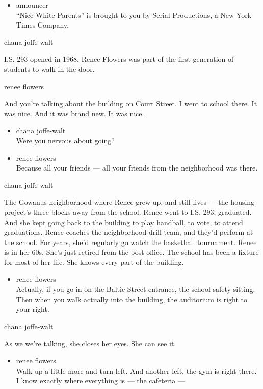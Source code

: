 \begin{itemize}
\tightlist
\item
  announcer\\
  ``Nice White Parents'' is brought to you by Serial Productions, a New
  York Times Company.
\end{itemize}

chana joffe-walt

I.S. 293 opened in 1968. Renee Flowers was part of the first generation
of students to walk in the door.

renee flowers

And you're talking about the building on Court Street. I went to school
there. It was nice. And it was brand new. It was nice.

\begin{itemize}
\item
  chana joffe-walt\\
  Were you nervous about going?
\item
  renee flowers\\
  Because all your friends --- all your friends from the neighborhood
  was there.
\end{itemize}

chana joffe-walt

The Gowanus neighborhood where Renee grew up, and still lives --- the
housing project's three blocks away from the school. Renee went to I.S.
293, graduated. And she kept going back to the building to play
handball, to vote, to attend graduations. Renee coaches the neighborhood
drill team, and they'd perform at the school. For years, she'd regularly
go watch the basketball tournament. Renee is in her 60s. She's just
retired from the post office. The school has been a fixture for most of
her life. She knows every part of the building.

\begin{itemize}
\tightlist
\item
  renee flowers\\
  Actually, if you go in on the Baltic Street entrance, the school
  safety sitting. Then when you walk actually into the building, the
  auditorium is right to your right.
\end{itemize}

chana joffe-walt

As we we're talking, she closes her eyes. She can see it.

\begin{itemize}
\tightlist
\item
  renee flowers\\
  Walk up a little more and turn left. And another left, the gym is
  right there. I know exactly where everything is --- the cafeteria ---
\end{itemize}

